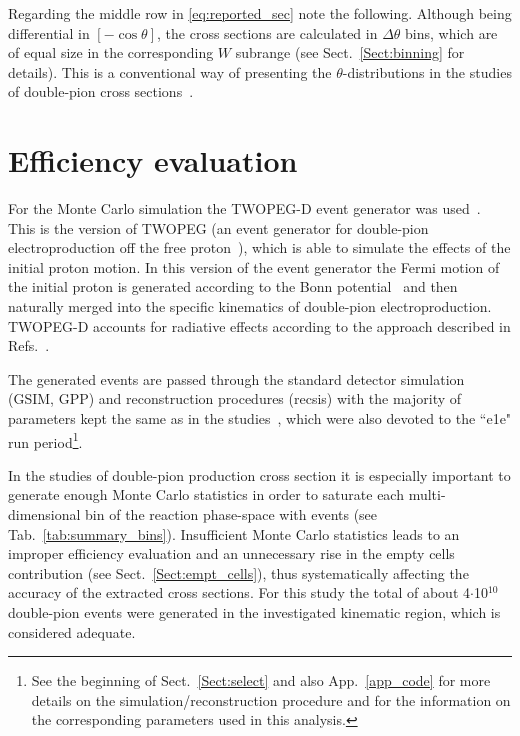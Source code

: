 Regarding the middle row in \eqref{eq:reported_sec} note the following. Although being differential in $[-\cos\theta]$, the cross sections are calculated in $\Delta \theta$ bins, which are of equal size in the corresponding $W$ subrange (see Sect.~\ref{Sect:binning} for details). This is a conventional way of presenting the $\theta$-distributions in the studies of double-pion cross sections~\cite{Rip_an_note:2002,Ripani:2002ss,Fed_an_note:2007,Fedotov:2008aa,Isupov:2017lnd,Arjun,Fed_an_note:2017,Fed_paper_2018}.
\newpage

\section{Efficiency evaluation}
\label{Sect:eff_eval}


For the Monte Carlo simulation the TWOPEG-D event generator was used~\cite{twopeg-d}. This is the version of TWOPEG (an event generator for double-pion electroproduction off the free proton~\cite{twopeg}), which is able to simulate the effects of the initial proton motion. In this version of the event generator the Fermi motion of the initial proton is generated according to the Bonn potential~\cite{Machleidt:1987hj} and then naturally merged into the specific kinematics of double-pion electroproduction. TWOPEG-D accounts for radiative effects according to the approach described in Refs.~\cite{Mo:1968cg,twopeg}.

The generated events are passed through the standard detector simulation (GSIM, GPP) and reconstruction procedures (recsis) with the majority of parameters kept the same as in the studies~\cite{Fed_an_note:2017,Markov:2014}, which were also devoted to the ``e1e" run period\footnote[13]{See the beginning of Sect.~\ref{Sect:select} and also App.~\ref{app_code} for more details on the simulation/reconstruction procedure and for the information on the corresponding parameters used in this analysis.}.



In the studies of double-pion production cross section it is especially important to generate enough Monte Carlo statistics in order to saturate each multi-dimensional bin of the reaction phase-space with events (see Tab.~\ref{tab:summary_bins}). Insufficient Monte Carlo statistics leads to an improper efficiency evaluation and an unnecessary rise in the empty cells contribution (see Sect.~\ref{Sect:empt_cells}), thus systematically affecting the accuracy of the extracted cross sections. For this study the total of about 4$\cdot$10$^{10}$ double-pion events were generated in the investigated kinematic region, which is considered adequate.

